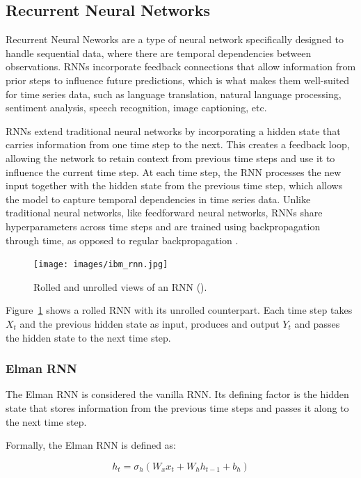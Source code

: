 \documentclass[conference]{IEEEtran}
\begin{document}
\subsection{\textbf{Recurrent Neural Networks}}

Recurrent Neural Neworks are a type of neural network specifically designed to handle sequential data, where there are temporal dependencies between observations. RNNs incorporate feedback connections that allow information from prior steps to influence future predictions, which is what makes them well-suited for time series data, such as language translation, natural language processing, sentiment analysis, speech recognition, image captioning, etc.

RNNs extend traditional neural networks by incorporating a hidden state that carries information from one time step to the next. This creates a feedback loop, allowing the network to retain context from previous time steps and use it to influence the current time step. At each time step, the RNN processes the new input together with the hidden state from the previous time step, which allows the model to capture temporal dependencies in time series data. Unlike traditional neural networks, like feedforward neural networks, RNNs share hyperparameters across time steps and are trained using backpropagation through time, as opposed to regular backpropagation \cite{ibm_rnn}.

\begin{figure}[H]
  \centering
  \texttt{[image: images/ibm\_rnn.jpg]}
  \caption{Rolled and unrolled views of an RNN (\cite{ibm_rnn}).}
  \label{fig:ibm_rnn}
\end{figure}

Figure~\ref{fig:ibm_rnn} shows a rolled RNN with its unrolled counterpart. Each time step takes $X_t$ and the previous hidden state as input, produces and output $Y_t$ and passes the hidden state to the next time step.

\subsubsection{\textbf{Elman RNN}}

The Elman RNN is considered the vanilla RNN. Its defining factor is the hidden state that stores information from the previous time steps and passes it along to the next time step.

Formally, the Elman RNN is defined as:

$$
h_t = \sigma_h(W_x x_t + W_h h_{t-1} + b_h)
$$
\end{document}
